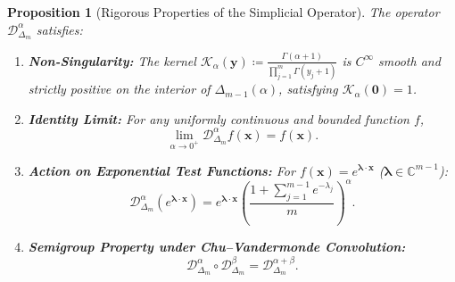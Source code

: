 \documentclass[11pt,a4paper]{article}
\theoremstyle{plain}
\newtheorem{proposition}[theorem]{Proposition}
\theoremstyle{definition}
\theoremstyle{remark}
\numberwithin{equation}{section}
\begin{document}
\begin{proposition}[Rigorous Properties of the Simplicial Operator]
\label{prop:fractional_props}
The operator $\mathcal{D}_{\Delta_m}^\alpha$ satisfies:
\begin{enumerate}
    \item \textbf{Non-Singularity:} The kernel $\mathcal{K}_\alpha(\mathbf{y}) \coloneqq \frac{\Gamma(\alpha+1)}{\prod_{j=1}^m \Gamma(y_j+1)}$ is $C^\infty$ smooth and strictly positive on the interior of $\Delta_{m-1}(\alpha)$, satisfying $\mathcal{K}_\alpha(\mathbf{0}) = 1$.
    \item \textbf{Identity Limit:} For any uniformly continuous and bounded function $f$,
    \begin{equation}
    \lim_{\alpha \to 0^+} \mathcal{D}_{\Delta_m}^\alpha f(\mathbf{x}) = f(\mathbf{x}).
    \end{equation}
    \item \textbf{Action on Exponential Test Functions:} For $f(\mathbf{x}) = e^{\boldsymbol{\lambda}\cdot\mathbf{x}}$ ($\boldsymbol{\lambda} \in \mathbb{C}^{m-1}$):
    \begin{equation}
    \mathcal{D}_{\Delta_m}^\alpha \left(e^{\boldsymbol{\lambda}\cdot\mathbf{x}}\right) = e^{\boldsymbol{\lambda}\cdot\mathbf{x}} \left(\frac{1 + \sum_{j=1}^{m-1}e^{-\lambda_j}}{m}\right)^\alpha.
    \end{equation}
    \item \textbf{Semigroup Property under Chu--Vandermonde Convolution:}
    \begin{equation}
    \mathcal{D}_{\Delta_m}^\alpha \circ \mathcal{D}_{\Delta_m}^\beta = \mathcal{D}_{\Delta_m}^{\alpha+\beta}.
    \end{equation}
\end{enumerate}
\end{proposition}
\end{document}
